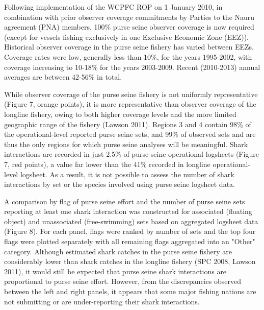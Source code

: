 \documentclass[12pt]{SCreport}
\begin{document}
Following implementation of the WCPFC ROP on 1 January 2010, in combination with prior observer coverage commitments by Parties to the Nauru agreement (PNA) members, 100\% purse seine observer coverage is now required (except for vessels fishing exclusively in one Exclusive Economic Zone (EEZ)). Historical observer coverage in the purse seine fishery has varied between EEZs. Coverage rates were low, generally less than 10\%, for the years 1995-2002, with coverage increasing to 10-18\% for the years 2003-2009. Recent (2010-2013) annual averages are between 42-56\% in total.


While observer coverage of the purse seine fishery is not uniformly representative (Figure 7, orange points), it is more representative than observer coverage of the longline fishery, owing to both higher coverage levels and the more limited geographic range of the fishery (Lawson 2011). Regions 3 and 4 contain 98\% of the operational-level reported purse seine sets, and 99\% of observed sets and are thus the only regions for which purse seine analyses will be meaningful. Shark interactions are recorded in just 2.5\% of purse-seine operational logsheets (Figure 7, red points), a value far lower than the 41\% recorded in longline operational-level logsheet. As a result, it is not possible to assess the number of shark interactions by set or the species involved using purse seine logsheet data.

A comparison by flag of purse seine effort and the number of purse seine sets reporting at least one shark interaction was constructed for associated (floating object) and unassociated (free-swimming) sets based on aggregated logsheet data (Figure 8).  For each panel, flags were ranked by number of sets and the top four flags were plotted separately with all remaining flags aggregated into an "Other" category. Although estimated shark catches in the purse seine fishery are considerably lower than shark catches in the longline fishery (SPC 2008, Lawson 2011), it would still be expected that purse seine shark interactions are proportional to purse seine effort. However, from the discrepancies observed between the left and right panels, it appears that some major fishing nations are not submitting or are under-reporting their shark interactions.

 
\end{document}
